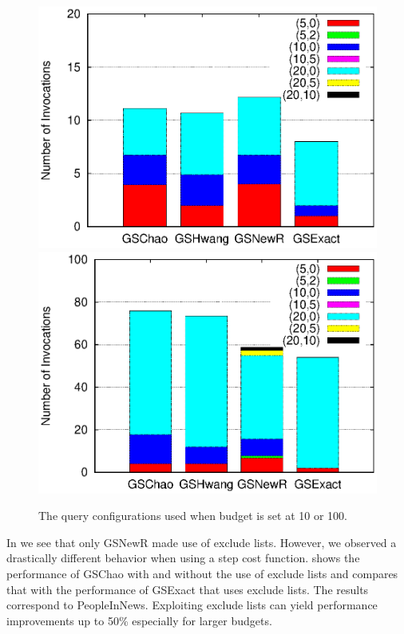 \begin{figure}
   	 \includegraphics[clip,scale=0.32]{figs/queryConfBudget10.eps}
	\includegraphics[clip,scale=0.32]{figs/queryConfBudget100.eps}
	\caption{The query configurations used when budget is set at 10 or 100.}\label{fig:queryconf}
		\vspace{-10pt}
\end{figure}

 In  we see that only GSNewR made use of exclude lists. However, we observed a drastically different behavior when using a step cost function.  shows the performance of GSChao with and without the use of exclude lists and compares that with the performance of GSExact that uses exclude lists. The results correspond to PeopleInNews. Exploiting exclude lists can yield performance improvements up to 50\% especially for larger budgets.

